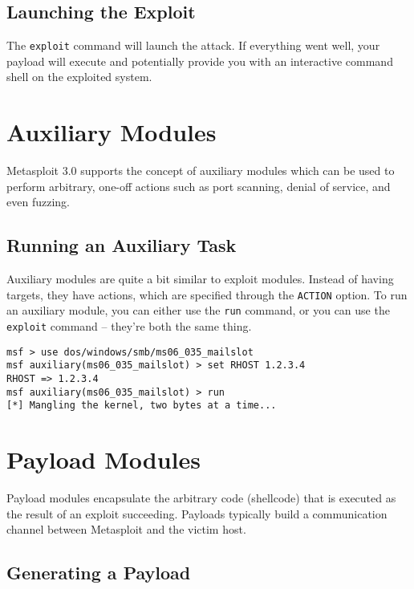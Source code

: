 \documentclass{report}
\begin{document}
		\subsection{Launching the Exploit}

\par The \texttt{exploit} command will launch the attack. If everything went
well, your payload will execute and potentially provide you with an
interactive command shell on the exploited system. 

	\section{Auxiliary Modules}

\par
Metasploit 3.0 supports the concept of auxiliary modules which can be used to
perform arbitrary, one-off actions such as port scanning, denial of service,
and even fuzzing.
	
		\subsection{Running an Auxiliary Task}

\par
Auxiliary modules are quite a bit similar to exploit modules.  Instead of
having targets, they have actions, which are specified through the
\texttt{ACTION} option.  To run an auxiliary module, you can either use the
\texttt{run} command, or you can use the \texttt{exploit} command -- they're
both the same thing.

\begin{verbatim}
msf > use dos/windows/smb/ms06_035_mailslot
msf auxiliary(ms06_035_mailslot) > set RHOST 1.2.3.4
RHOST => 1.2.3.4
msf auxiliary(ms06_035_mailslot) > run
[*] Mangling the kernel, two bytes at a time...
\end{verbatim} 

	\section{Payload Modules}

\par
Payload modules encapsulate the arbitrary code (shellcode) that is executed as
the result of an exploit succeeding.  Payloads typically build a communication
channel between Metasploit and the victim host.

		\subsection{Generating a Payload}
\end{document}
